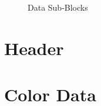 \begin{refsection}
\begin{algorithm}[H]
\begin{algorithmic}[1]

    \end{algorithmic}
  \end{algorithm}

  \begin{figure}
    \centering
    \caption{\gif Data Sub-Blocks}
    \label{fig:gif-data-sub-blocks}
  \end{figure}

  \section{Header}

  \section{Color Data}

  \printbibliography[heading=  subbibliography]

\end{refsection}
